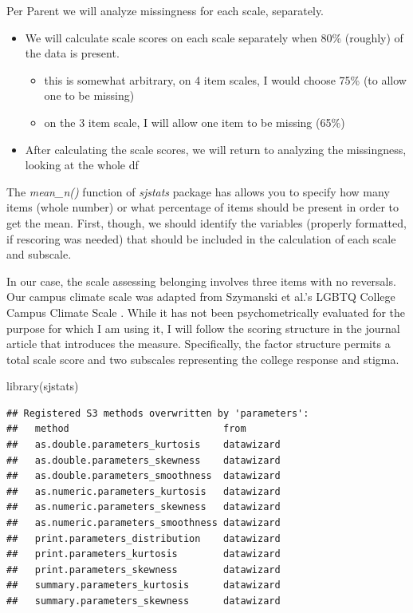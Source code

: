 \documentclass[
  11pt,
]{book}
\newenvironment{Shaded}{\begin{snugshade}}{\end{snugshade}}
\newcommand{\FunctionTok}[1]{\textcolor[rgb]{0.00,0.00,0.00}{#1}}
\newcommand{\NormalTok}[1]{#1}
\providecommand{\tightlist}{%
  \setlength{\itemsep}{0pt}\setlength{\parskip}{0pt}}
\begin{document}
Per Parent \citeyearpar{parent_handling_2013} we will analyze missingness for each scale, separately.

\begin{itemize}
\tightlist
\item
  We will calculate scale scores on each scale separately when 80\% (roughly) of the data is present.

  \begin{itemize}
  \tightlist
  \item
    this is somewhat arbitrary, on 4 item scales, I would choose 75\% (to allow one to be missing)
  \item
    on the 3 item scale, I will allow one item to be missing (65\%)
  \end{itemize}
\item
  After calculating the scale scores, we will return to analyzing the missingness, looking at the whole df
\end{itemize}

The \emph{mean\_n()} function of \emph{sjstats} package has allows you to specify how many items (whole number) or what percentage of items should be present in order to get the mean. First, though, we should identify the variables (properly formatted, if rescoring was needed) that should be included in the calculation of each scale and subscale.

In our case, the scale assessing belonging \citep{bollen_perceived_1990, hurtado_effects_1997} involves three items with no reversals. Our campus climate scale was adapted from Szymanski et al.'s LGBTQ College Campus Climate Scale \citep{szymanski_perceptions_2020}. While it has not been psychometrically evaluated for the purpose for which I am using it, I will follow the scoring structure in the journal article that introduces the measure. Specifically, the factor structure permits a total scale score and two subscales representing the college response and stigma.

\begin{Shaded}
\begin{Highlighting}[]
\FunctionTok{library}\NormalTok{(sjstats)}
\end{Highlighting}
\end{Shaded}

\begin{verbatim}
## Registered S3 methods overwritten by 'parameters':
##   method                           from      
##   as.double.parameters_kurtosis    datawizard
##   as.double.parameters_skewness    datawizard
##   as.double.parameters_smoothness  datawizard
##   as.numeric.parameters_kurtosis   datawizard
##   as.numeric.parameters_skewness   datawizard
##   as.numeric.parameters_smoothness datawizard
##   print.parameters_distribution    datawizard
##   print.parameters_kurtosis        datawizard
##   print.parameters_skewness        datawizard
##   summary.parameters_kurtosis      datawizard
##   summary.parameters_skewness      datawizard
\end{verbatim}
\end{document}
